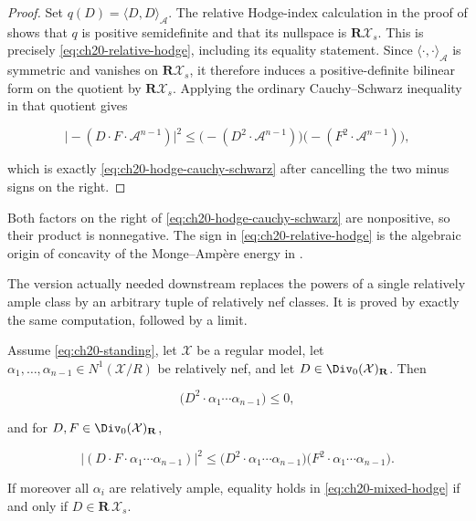\begin{proof}
Set $q(D)=\langle D,D\rangle_{\mathcal A}$.  The relative Hodge-index
calculation in the proof of  shows that $q$ is
positive semidefinite and that its nullspace is
$\mathbf R\mathcal X_s$.  This is precisely
\eqref{eq:ch20-relative-hodge}, including its equality statement.  Since
$\langle\cdot,\cdot\rangle_{\mathcal A}$ is symmetric and vanishes on
$\mathbf R\mathcal X_s$, it therefore induces a positive-definite
bilinear form on the quotient by $\mathbf R\mathcal X_s$.  Applying the
ordinary Cauchy--Schwarz inequality in that quotient gives

\[
 \bigl|-(D\cdot F\cdot\mathcal A^{n-1})\bigr|^2
 \leq
 \bigl(-(D^2\cdot\mathcal A^{n-1})\bigr)
 \bigl(-(F^2\cdot\mathcal A^{n-1})\bigr),
\]

which is exactly \eqref{eq:ch20-hodge-cauchy-schwarz} after cancelling the
two minus signs on the right.
\end{proof}

Both factors on the right of \eqref{eq:ch20-hodge-cauchy-schwarz} are
nonpositive, so their product is nonnegative.  The sign in
\eqref{eq:ch20-relative-hodge} is the algebraic origin of concavity of the
Monge--Amp\`ere energy in .

The version actually needed downstream replaces the powers of a single
relatively ample class by an arbitrary tuple of relatively nef classes.  It
is proved by exactly the same computation, followed by a limit.

\begin{theorem}
\label{thm:ch20-mixed-hodge}
Assume \eqref{eq:ch20-standing}, let $\mathcal X$ be a regular model, let
$\alpha_1,\ldots,\alpha_{n-1}\in N^1(\mathcal X/R)$ be relatively nef, and
let $D\in\Div_0(\mathcal X)_{\mathbf R}$.  Then

\begin{equation}
\label{eq:ch20-mixed-hodge}
 \bigl(D^2\cdot\alpha_1\cdots\alpha_{n-1}\bigr)\leq0 ,
\end{equation}

and for $D,F\in\Div_0(\mathcal X)_{\mathbf R}$,

\begin{equation}
\label{eq:ch20-mixed-cauchy-schwarz}
 \bigl|(D\cdot F\cdot\alpha_1\cdots\alpha_{n-1})\bigr|^2
 \leq
 \bigl(D^2\cdot\alpha_1\cdots\alpha_{n-1}\bigr)
 \bigl(F^2\cdot\alpha_1\cdots\alpha_{n-1}\bigr).
\end{equation}

If moreover all $\alpha_i$ are relatively ample, equality holds in
\eqref{eq:ch20-mixed-hodge} if and only if $D\in\mathbf R\,\mathcal X_s$.
\end{theorem}


